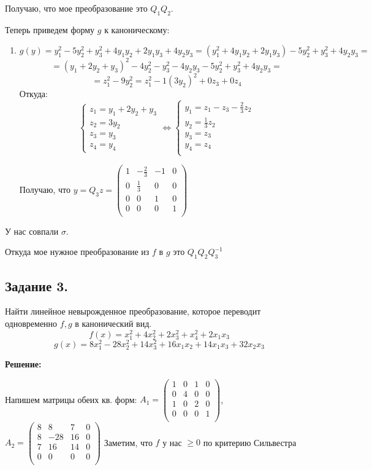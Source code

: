 \documentclass{article}
\begin{document}
Получаю, что мое преобразование это $Q_1Q_2$.

Теперь приведем форму $g$ к каноническому:
\begin{enumerate}
    \item $$g(y) = y_1^2 - 5y_2^2  + y_3^2 +4y_1y_2 + 2y_1 y_3 + 4y_2y_3 = (y_1^2 + 4y_1y_2 + 2y_1 y_3)- 5y_2^2  + y_3^2+4y_2y_3= $$
    $$= (y_1 + 2y_2 + y_3)^2 - 4y_2^2 -y_3^2 - 4y_2y_3- 5y_2^2  + y_3^2+4y_2y_3 = $$
    $$= z_1^2 - 9y_2^2 = z_1^2 - 1(3y_2)^2 + 0z_3 + 0z_4$$
    Откуда:
    $$\begin{cases}
        z_1 = y_1 + 2y_2 + y_3\\
        z_2 =  3y_2 \\
        z_3 = y_3 \\ z_4 = y_4
        \end{cases} \Leftrightarrow \begin{cases}
            y_1= z_1-z_3-\frac{2}{3}z_2\\
            y_2 = \frac{1}{3}z_2\\
            y_3 = z_3 \\
            y_4 = z_4\\
        \end{cases}$$

    Получаю, что $y = Q_3 z = \begin{pmatrix}
        1 &  -\frac{2}{3} & -1 & 0\\
         0 &  \frac{1}{3} & 0 & 0\\
          0 &  0 & 1 & 0\\
           0 &  0 & 0 & 1\\
    \end{pmatrix}$
\end{enumerate}

У нас совпали $\sigma$.

Откуда мое нужное преобразование из $f$ в $g$ это $Q_1Q_2Q_3^{-1}$ 
\newpage
\subsection{Задание 3.}

Найти линейное  невырожденное преобразование, которое переводит одновременно $f,g$ в канонический вид.
$$f(x) = x_1^2 + 4x_2^2 + 2x_3^2 + x_4^2 + 2x_1x_3$$
$$g(x) = 8x_1^2 -28x_2^2  + 14x_3^2 +16x_1x_2 + 14x_1x_3 +32x_2x_3$$

\textbf{Решение:}

Напишем матрицы обеих кв. форм: $A_1 = \begin{pmatrix}
     1 & 0 & 1 & 0\\
      0 & 4 & 0 & 0\\
      1& 0 & 2 & 0\\
       0 & 0 & 0 & 1\\
\end{pmatrix}$, $A_2 = \begin{pmatrix}
     8 & 8 & 7 & 0\\
      8 & -28 & 16 & 0\\
      7 & 16 & 14 & 0\\
       0 & 0 & 0 & 0\\
\end{pmatrix}$
Заметим, что $f$ у нас $\geq 0 $ по критерию Сильвестра
\end{document}
